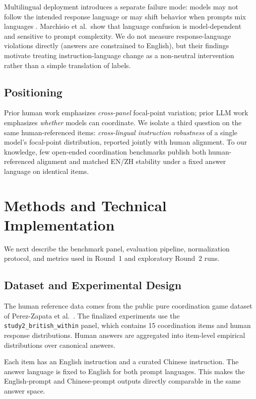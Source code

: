 \documentclass[11pt]{article}
\begin{document}
Multilingual deployment introduces a separate failure mode: models may not follow the intended response language or may shift behavior when prompts mix languages \cite{marchisio2024language}. Marchisio et al.\ show that language confusion is model-dependent and sensitive to prompt complexity. We do not measure response-language violations directly (answers are constrained to English), but their findings motivate treating instruction-language change as a non-neutral intervention rather than a simple translation of labels.

\subsection{Positioning}

Prior human work emphasizes \emph{cross-panel} focal-point variation; prior LLM work emphasizes \emph{whether} models can coordinate. We isolate a third question on the same human-referenced items: \emph{cross-lingual instruction robustness} of a single model's focal-point distribution, reported jointly with human alignment. To our knowledge, few open-ended coordination benchmarks publish both human-referenced alignment and matched EN/ZH stability under a fixed answer language on identical items.

\section{Methods and Technical Implementation}
\label{sec:methods}

We next describe the benchmark panel, evaluation pipeline, normalization protocol, and metrics used in Round~1 and exploratory Round~2 runs.

\subsection{Dataset and Experimental Design}

The human reference data comes from the public pure coordination game dataset of Perez-Zapata et al.\ \cite{perez2026}. The finalized experiments use the \texttt{study2\_british\_within} panel, which contains 15 coordination items and human response distributions. Human answers are aggregated into item-level empirical distributions over canonical answers.

Each item has an English instruction and a curated Chinese instruction. The answer language is fixed to English for both prompt languages. This makes the English-prompt and Chinese-prompt outputs directly comparable in the same answer space.
\end{document}
